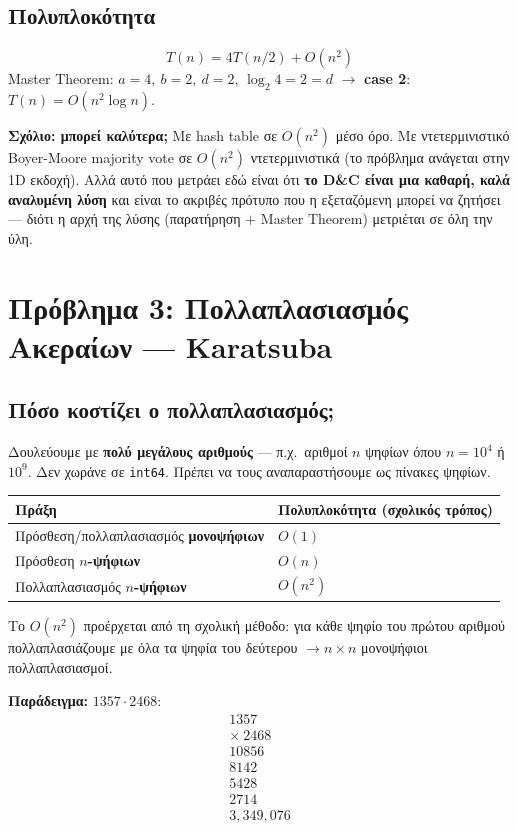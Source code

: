 \documentclass[11pt,a4paper]{article}
\begin{document}
\subsection{Πολυπλοκότητα}

\[
T(n) = 4 T(n/2) + O(n^2)
\]
Master Theorem: $a = 4,\ b = 2,\ d = 2$, $\log_2 4 = 2 = d$ $\to$ \textbf{case
2}: $T(n) = O(n^2 \log n)$.

\textbf{Σχόλιο: μπορεί καλύτερα;} Με hash table σε $O(n^2)$ μέσο όρο. Με
ντετερμινιστικό Boyer-Moore majority vote σε $O(n^2)$ ντετερμινιστικά (το
πρόβλημα ανάγεται στην 1D εκδοχή). Αλλά αυτό που μετράει εδώ είναι ότι \textbf{το
D\&C είναι μια καθαρή, καλά αναλυμένη λύση} και είναι το ακριβές πρότυπο που η
εξεταζόμενη μπορεί να ζητήσει --- διότι η αρχή της λύσης (παρατήρηση $+$ Master
Theorem) μετριέται σε όλη την ύλη.

\section{Πρόβλημα 3: Πολλαπλασιασμός Ακεραίων --- Karatsuba}

\subsection{Πόσο κοστίζει ο πολλαπλασιασμός;}

Δουλεύουμε με \textbf{πολύ μεγάλους αριθμούς} --- π.χ.\ αριθμοί $n$ ψηφίων όπου
$n = 10^4$ ή $10^9$. Δεν χωράνε σε \texttt{int64}. Πρέπει να τους
αναπαραστήσουμε ως πίνακες ψηφίων.

\begin{center}
\begin{tabular}{@{}l l@{}}
\toprule
Πράξη & Πολυπλοκότητα (σχολικός τρόπος) \\
\midrule
Πρόσθεση/πολλαπλασιασμός \textbf{μονοψήφιων} & $O(1)$ \\
Πρόσθεση \textbf{$n$-ψήφιων}                 & $O(n)$ \\
Πολλαπλασιασμός \textbf{$n$-ψήφιων}          & $O(n^2)$ \\
\bottomrule
\end{tabular}
\end{center}

Το $O(n^2)$ προέρχεται από τη σχολική μέθοδο: για κάθε ψηφίο του πρώτου αριθμού
πολλαπλασιάζουμε με όλα τα ψηφία του δεύτερου $\to n \times n$ μονοψήφιοι
πολλαπλασιασμοί.

\textbf{Παράδειγμα:} $1357 \cdot 2468$:
\[
\begin{array}{r}
1357 \\
\times\ 2468 \\
\hline
10856 \\
8142\phantom{0} \\
5428\phantom{00} \\
2714\phantom{000} \\
\hline
3{,}349{,}076
\end{array}
\]
\end{document}
